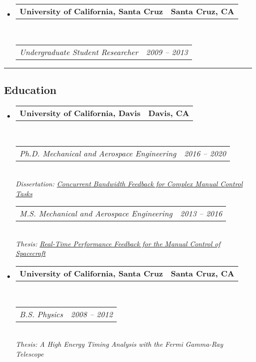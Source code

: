 \documentclass[10pt,letterpaper]{article}
\makeatletter
\newcommand{\headerrow}[2]
{\begin{tabular*}{\linewidth}{l@{\extracolsep{\fill}}r}
	#1 &
	#2 \\
\end{tabular*}}
\makeatother
\begin{document}
\begin{itemize}
	\item
	      \headerrow
	      {\textbf{University of California, Santa Cruz}}
	      {\textbf{Santa Cruz, CA}}
	      \\
	      \headerrow
	      {\emph{Undergraduate Student Researcher}}
	      {\emph{2009 -- 2013}}

\end{itemize}

\hrule
\vspace{-0.5em}
\subsection*{Education}

\begin{itemize}
	\parskip=0.1em
	\item
	      \headerrow
	      {\textbf{University of California, Davis}}
	      {\textbf{Davis, CA}}
	      \\
	      \headerrow
	      {\emph{Ph.D. Mechanical and Aerospace Engineering}}
	      {\emph{2016 -- 2020}}
	      \\
	      \emph{Dissertation: \href{https://www.proquest.com/dissertations-theses/concurrent-bandwidth-feedback-complex-manual/docview/2449468766/se-2}{Concurrent Bandwidth Feedback for Complex Manual Control Tasks}}
	      \vspace{0.5em} %
	      \\
	      \headerrow
	      {\emph{M.S. Mechanical and Aerospace Engineering}}
	      {\emph{2013 -- 2016}}
	      \\
	      \emph{Thesis: \href{https://www.proquest.com/dissertations-theses/real-time-performance-feedback-manual-control/docview/1872339216/se-2}{Real-Time Performance Feedback for the Manual Control of Spacecraft}}
	\item
	      \headerrow
	      {\textbf{University of California, Santa Cruz}}
	      {\textbf{Santa Cruz, CA}}
	      \\
	      \headerrow
	      {\emph{B.S. Physics}}
	      {\emph{2008 -- 2012}}
	      \\
	      \emph{Thesis: A High Energy Timing Analysis with the Fermi Gamma-Ray Telescope}
\end{itemize}
\end{document}
